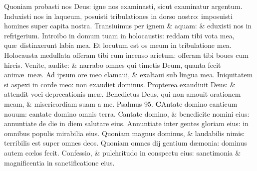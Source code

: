 \documentclass[a5paper,10pt]{book}
\def\ae{æ}
\def\oe{œ}
\begin{document}
\begin{multicols*}{2}
\newline \color{red} Q\color{black}uoniam probasti nos Deus: igne nos examinasti, sicut examinatur argentum.
\newline \color{red} I\color{black}nduxisti nos in laqueum, posuisti tribulationes in dorso nostro: imposuisti homines super capita nostra.
\newline \color{red} T\color{black}ransiuimus per ignem \& aquam: \& eduxisti nos in refrigerium.
\newline \color{red} I\color{black}ntroibo in domum tuam in holocaustis: reddam tibi vota mea, qu\ae \ distinxerunt labia mea.
\newline \color{red} E\color{black}t locutum est os meum in tribulatione mea.
\newline \color{red} H\color{black}olocausta medullata offeram tibi cum incenso arietum: offeram tibi boues cum hircis.
\newline \color{red} V\color{black}enite, audite: \& narrabo omnes qui timetis Deum, quanta fecit anim\ae \ me\ae .
\newline \color{red} A\color{black}d ipsum ore meo clamaui, \& exaltaui sub lingua mea.%
\newline \color{red} I\color{black}niquitatem si aspexi in corde meo: non exaudiet dominus.
\newline \color{red} P\color{black}ropterea exaudiuit Deus: \& attendit voci deprecationis me\ae .
\newline \color{red} B\color{black}enedictus Deus, qui non amouit orationem meam, \& misericordiam suam a me. \quad \color{red} Psalmus 95. \color{black}
\vspace{-1em}
\lettrine[lines=2]{\bfseries \color{red} C}{}Antate domino canticum nouum: cantate domino omnis terra.
\newline \color{red} C\color{black}antate domino, \& benedicite nomini eius: annuntiate de die in diem salutare eius.
\newline \color{red} A\color{black}nnuntiate inter gentes gloriam eius: in omnibus populis mirabilia eius.
\newline \color{red} Q\color{black}uoniam magnus dominus, \& laudabilis nimis: terribilis est super omnes deos.
\newline \color{red} Q\color{black}uoniam omnes dij gentium d\ae monia: dominus autem c\oe los fecit.
\newline \color{red} C\color{black}onfessio, \& pulchritudo in conspectu eius: sanctimonia \& magnificentia in sanctificatione eius.

\end{multicols*}
\end{document}

